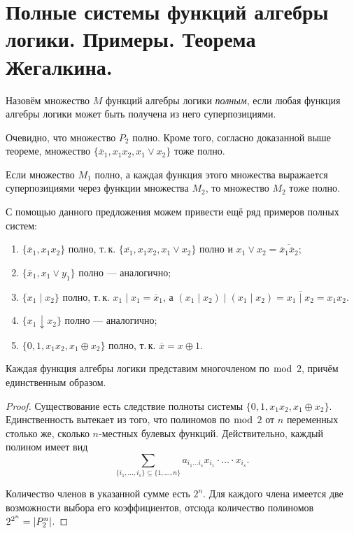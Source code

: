 \section{Полные системы функций алгебры логики. Примеры. Теорема Жегалкина.}

\begin{definition}
    Назовём множество $M$ функций алгебры логики \textit{полным}, если любая функция алгебры логики может быть получена из него суперпозициями.
\end{definition}

\begin{remark}
    Очевидно, что множество $P_2$ полно. Кроме того, согласно доказанной выше теореме, множество $\{\overline{x}_1, x_1x_2, x_1 \vee x_2\}$ тоже полно.
\end{remark}

\begin{proposal}
    Если множество $M_1$ полно, а каждая функция этого множества выражается суперпозициями через функции множества $M_2$, то множество $M_2$ тоже полно.
\end{proposal}

С помощью данного предложения можем привести ещё ряд примеров полных систем:
\begin{enumerate}
    \item $\{\overline{x}_1, x_1x_2\}$ полно, т.\,к. $\{\overline{x_1}, x_1x_2, x_1 \vee x_2\}$ полно и $x_1 \vee x_2 = \overline{\overline{x}_1\overline{x}_2}$;
    \item $\{\overline{x}_1, x_1 \vee y_1\}$ полно --- аналогично;
    \item $\{x_1 \mid x_2\}$ полно, т.\,к. $x_1 \mid x_1 = \overline{x}_1$, а $(x_1 \mid x_2) \mid (x_1 \mid x_2) = \overline{x_1 \mid x_2} = x_1x_2$.
    \item $\{x_1 \downarrow x_2\}$ полно --- аналогично;
    \item $\{0, 1, x_1x_2, x_1 \oplus x_2\}$ полно, т.\,к. $\overline{x} = x \oplus 1$.
\end{enumerate}

\begin{theorem}[Жегалкин]
    Каждая функция алгебры логики представим многочленом по $\bmod$ $2$, причём единственным образом.
\end{theorem}

\begin{proof}
    Существование есть следствие полноты системы $\{0, 1, x_1x_2, x_1 \oplus x_2\}$. Единственность вытекает из того, что полиномов по $\bmod$ $2$ от $n$ переменных столько же, сколько $n$-местных булевых функций. Действительно, каждый полином имеет вид
    \[
        \sum_{\{i_1, \ldots, i_s\} \subseteq \{1, \ldots, n\}}a_{i_1\ldots i_s}x_{i_1}\cdot\ldots\cdot x_{i_s}.
    \]

    Количество членов в указанной сумме есть $2^n$. Для каждого члена имеется две возможности выбора его коэффициентов, отсюда количество полиномов $2^{2^n} = \left\lvert P_2^n\right\rvert$.
\end{proof}

